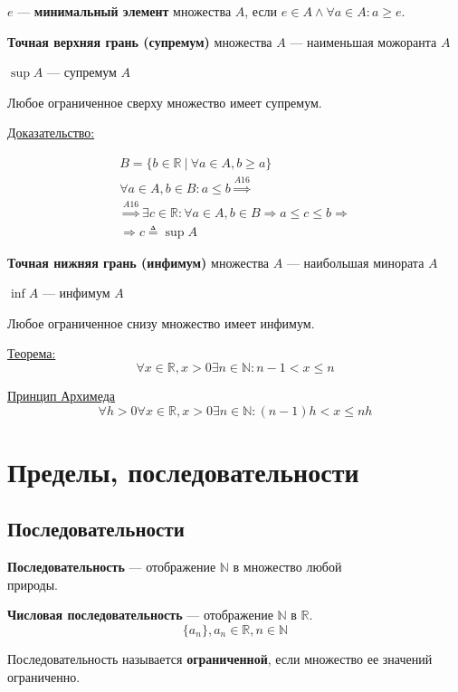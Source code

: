 \documentclass{article}
\begin{document}
$e$ --- \textbf{минимальный элемент} множества $A$, если $e \in A \land \forall a \in A : a \ge e$.

\textbf{Точная верхняя грань (супремум)} множества $A$ --- наименьшая можоранта $A$

$\sup A$ --- супремум $A$

Любое ограниченное сверху множество имеет супремум.

\underline{Доказательство:}

\begin{gather*}
	B = \{b \in \mathbb{R}\ |\ \forall a \in A, b \ge a\} \\
	\forall a \in A, b \in B : a \le b \stackrel{A16}{\Rightarrow} \\
	\stackrel{A16}{\Rightarrow} \exists c \in \mathbb{R} :
	\forall a \in A, b \in B \Rightarrow a \le c \le b \Rightarrow \\
	\Rightarrow c \triangleq \sup A
\end{gather*}

\textbf{Точная нижняя грань (инфимум)} множества $A$ --- наибольшая минората $A$

$\inf A$ --- инфимум $A$

Любое ограниченное снизу множество имеет инфимум.

\pagebreak
\underline{Теорема:}
\[
	\forall x \in \mathbb{R}, x > 0 \exists n \in \mathbb{N} : n - 1 < x \le n
\]

\underline{Принцип Архимеда}
\[
\forall h > 0 \forall x \in \mathbb{R}, x > 0 \exists n \in \mathbb{N} : (n - 1)h < x \le nh
\]

\section{Пределы, последовательности}

\subsection{Последовательности}

\textbf{Последовательность} --- отображение $\mathbb{N}$ в множество любой \\
природы.

\textbf{Числовая последовательность} --- отображение $\mathbb{N}$ в $\mathbb{R}$.
\[ \{ a_n \}, a_n \in \mathbb{R}, n \in \mathbb{N} \]

Последовательность называется \textbf{ограниченной}, если множество ее значений ограниченно.
\end{document}
